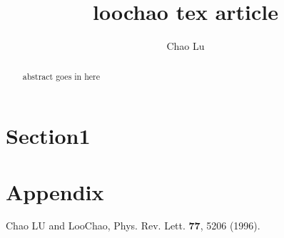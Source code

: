 \documentclass[preprint,preprintnumbers]{revtex4}
\begin{document}
\title{ loochao tex article }
\author{Chao Lu}
\begin{abstract}
abstract goes in here
\end{abstract}

\maketitle
\section{Section1}
\appendix

\section{Appendix}

\begin{thebibliography}{99}
 Chao LU and LooChao, Phys. Rev. Lett. \textbf{77},
  5206 (1996).
\end{thebibliography}
\end{document}

